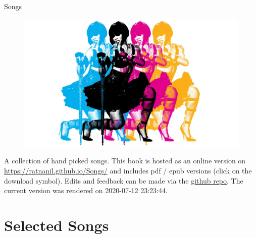 \documentclass[]{book}
\title{}
\author{}
\date{}
\begin{document}

\begin{titlepage}
\begin{center}
  

\end{center}
\vspace{1.5cm}
\begin{center}

{\LARGE Songs}

\end{center}
 \vspace{1cm}

\begin{figure}[htbp]
  \centering
  \includegraphics[width=1\textwidth]{misc/title.png}
  \label{titelbild}
\end{figure}

\begin{center}
\textbf{}


\end{center} 

\vspace{1.0cm}


\end{titlepage}

{
\setcounter{tocdepth}{1}
\tableofcontents
}
A collection of hand picked songs. This book is hosted as an online version on \url{https://ratnanil.github.io/Songs/} and includes pdf / epub versions (click on the download symbol). Edits and feedback can be made via the \href{https://github.com/ratnanil/songs}{github repo}. The current version was rendered on 2020-07-12 23:23:44.

\hypertarget{selected-songs}{%
\chapter{Selected Songs}\label{selected-songs}}
\end{document}
